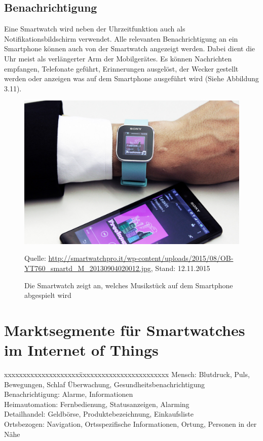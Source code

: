 \subsection{Benachrichtigung}
Eine Smartwatch wird neben der Uhrzeitfunktion auch als Notifikationsbildschirm verwendet. Alle relevanten Benachrichtigung an ein Smartphone können auch von der Smartwatch angezeigt werden. Dabei dient die Uhr meist als verlängerter Arm der Mobilgerätes. Es können Nachrichten empfangen, Telefonate geführt, Erinnerungen ausgelöst, der Wecker gestellt werden oder anzeigen was auf dem Smartphone ausgeführt wird (Siehe Abbildung 3.11).
\begin{figure}[H]
  \centering
  \includegraphics[scale=0.38]{98_Bilder/03_Marktsegmente/notifications}
  \caption[Smartwatch Anzeige von Smartphone]{Die Smartwatch zeigt an, welches Musikstück auf dem Smartphone abgespielt wird}
  \footnotesize Quelle: \url{http://smartwatchpro.it/wp-content/uploads/2015/08/OB-YT760_smartd_M_20130904020012.jpg}, Stand: 12.11.2015
\end{figure}
\newpage

\section{Marktsegmente für Smartwatches im Internet of Things}
\begin{tabbing}
xxxxxxxxxxxxxxxxxxxx\=xxxxxxxxxxxxxxxxxxxxxxxx	\kill
Mensch:		        \> Blutdruck, Puls, Bewegungen, Schlaf Überwachung, Gesundheitsbenachrichtigung \\
Benachrichtigung:	\> Alarme, Informationen \\
Heimautomation:	  \> Fernbedienung, Statusanzeigen, Alarming \\
Detailhandel:		  \> Geldbörse, Produktebezeichnung, Einkaufsliste \\
Ortsbezogen:		  \> Navigation, Ortsspezifische Informationen, Ortung, Personen in der Nähe \\
\end{tabbing}

